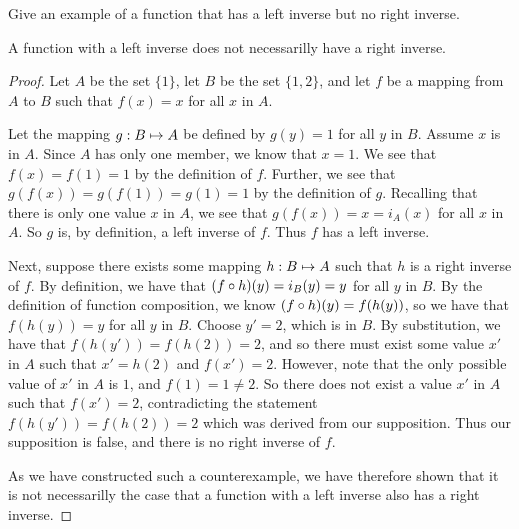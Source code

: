 \documentclass[main.tex]{subfiles}
\begin{document}
\subproblem{}\label{s2p5b}

Give an example of a function that has a left inverse but no right inverse.

\begin{thm}
	A function with a left inverse does not necessarilly have a right
	inverse.
\end{thm}
\begin{proof}
	Let \(A\) be the set \(\{1\}\), let \(B\) be the set \(\{1,2\}\), and
	let \(f\) be a mapping from \(A\) to \(B\) such that \(f(x) = x\) for
	all \(x\) in \(A\).

	Let the mapping \({g}: {B} \mapsto{} {A}\) be defined by \(g(y) = 1\) for all
	\(y\) in \(B\). Assume \(x\) is in \(A\). Since \(A\) has only one
	member, we know that \(x = 1\). We see that \(f(x) = f(1) = 1\) by the
	definition of \(f\). Further, we see that
	\(g(f(x)) = g(f(1)) = g(1) = 1\) by the definition of \(g\). Recalling
	that there is only one value \(x\) in \(A\), we see that
	\(g(f(x)) = x = i_A(x)\) for all \(x\) in \(A\). So \(g\) is, by
	definition, a left inverse of \(f\). Thus \(f\) has a left inverse.

	Next, suppose there exists some mapping \({h}: {B} \mapsto{} {A}\) such that
	\(h\) is a right inverse of \(f\). By definition, we have that
	\(({f} \circ{} {h})({y}) = i_B(y) = y\) for all \(y\) in \(B\). By the
	definition of function composition, we know
	\(({f} \circ{} {h})({y}) = f(h(y))\), so we have that \(f(h(y)) = y\)
	for all \(y\) in \(B\). Choose \(y' = 2\), which is in \(B\). By
	substitution, we have that \(f(h(y')) = f(h(2)) = 2\), and so there must
	exist some value \(x'\) in \(A\) such that \(x' = h(2)\) and
	\(f(x') = 2\). However, note that the only possible value of \(x'\) in
	\(A\) is \(1\), and \(f(1) = 1 \neq 2\). So there does not exist a value
	\(x'\) in \(A\) such that \(f(x') = 2\), contradicting the statement
	\(f(h(y')) = f(h(2)) = 2\) which was derived from our supposition. Thus
	our supposition is false, and there is no right inverse of \(f\).

	As we have constructed such a counterexample, we have therefore shown
	that it is not necessarilly the case that a function with a left inverse
	also has a right inverse.
\end{proof}
\end{document}
